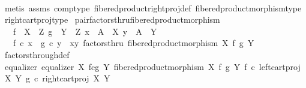 \begin{isabellebody}
%
\isadelimproof
\ \ %
\endisadelimproof
%
\isatagproof
{}\isamarkupfalse%
\ {\isacharparenleft}{\kern0pt}metis\ assms\ comp{\isacharunderscore}{\kern0pt}type\ fibered{\isacharunderscore}{\kern0pt}product{\isacharunderscore}{\kern0pt}right{\isacharunderscore}{\kern0pt}proj{\isacharunderscore}{\kern0pt}def\ fibered{\isacharunderscore}{\kern0pt}product{\isacharunderscore}{\kern0pt}morphism{\isacharunderscore}{\kern0pt}type\ right{\isacharunderscore}{\kern0pt}cart{\isacharunderscore}{\kern0pt}proj{\isacharunderscore}{\kern0pt}type{\isacharparenright}{\kern0pt}%
\endisatagproof
{\isafoldproof}%
%
\isadelimproof
\isanewline
%
\endisadelimproof
\isanewline
{}\isamarkupfalse%
\ pair{\isacharunderscore}{\kern0pt}factorsthru{\isacharunderscore}{\kern0pt}fibered{\isacharunderscore}{\kern0pt}product{\isacharunderscore}{\kern0pt}morphism{\isacharcolon}{\kern0pt}\isanewline
\ \ \ {\isachardoublequoteopen}f\ {\isacharcolon}{\kern0pt}\ X\ {\isasymrightarrow}\ Z{\isachardoublequoteclose}\ {\isachardoublequoteopen}g\ {\isacharcolon}{\kern0pt}\ Y\ {\isasymrightarrow}\ Z{\isachardoublequoteclose}\ {\isachardoublequoteopen}x\ {\isacharcolon}{\kern0pt}\ A\ {\isasymrightarrow}\ X{\isachardoublequoteclose}\ {\isachardoublequoteopen}y\ {\isacharcolon}{\kern0pt}\ A\ {\isasymrightarrow}\ Y{\isachardoublequoteclose}\isanewline
\ \ \ {\isachardoublequoteopen}f\ {\isasymcirc}\isactrlsub c\ x\ {\isacharequal}{\kern0pt}\ g\ {\isasymcirc}\isactrlsub c\ y\ {\isasymLongrightarrow}\ {\isasymlangle}x{\isacharcomma}{\kern0pt}y{\isasymrangle}\ factorsthru\ fibered{\isacharunderscore}{\kern0pt}product{\isacharunderscore}{\kern0pt}morphism\ X\ f\ g\ Y{\isachardoublequoteclose}\isanewline
%
\isadelimproof
\ \ %
\endisadelimproof
%
\isatagproof
{}\isamarkupfalse%
\ factors{\isacharunderscore}{\kern0pt}through{\isacharunderscore}{\kern0pt}def\isanewline
{}\isamarkupfalse%
\ {\isacharminus}{\kern0pt}\isanewline
\ \ \isamarkupfalse%
\ equalizer{\isacharcolon}{\kern0pt}\ {\isachardoublequoteopen}equalizer\ {\isacharparenleft}{\kern0pt}X\ \isactrlbsub f\isactrlesub {\isasymtimes}\isactrlsub c\isactrlbsub g\isactrlesub \ Y{\isacharparenright}{\kern0pt}\ {\isacharparenleft}{\kern0pt}fibered{\isacharunderscore}{\kern0pt}product{\isacharunderscore}{\kern0pt}morphism\ X\ f\ g\ Y{\isacharparenright}{\kern0pt}\ {\isacharparenleft}{\kern0pt}f\ {\isasymcirc}\isactrlsub c\ left{\isacharunderscore}{\kern0pt}cart{\isacharunderscore}{\kern0pt}proj\ X\ Y{\isacharparenright}{\kern0pt}\ {\isacharparenleft}{\kern0pt}g\ {\isasymcirc}\isactrlsub c\ right{\isacharunderscore}{\kern0pt}cart{\isacharunderscore}{\kern0pt}proj\ X\ Y{\isacharparenright}{\kern0pt}{\isachardoublequoteclose}\isanewline

\end{isabellebody}
